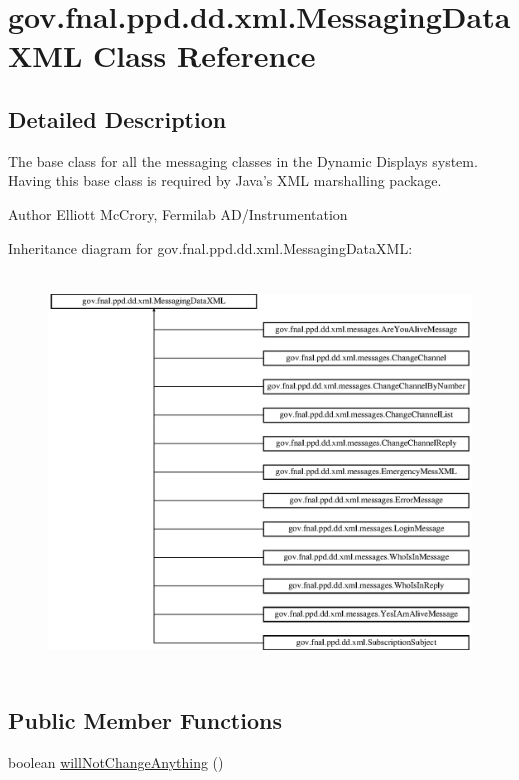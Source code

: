 \hypertarget{classgov_1_1fnal_1_1ppd_1_1dd_1_1xml_1_1MessagingDataXML}{\section{gov.\-fnal.\-ppd.\-dd.\-xml.\-Messaging\-Data\-X\-M\-L Class Reference}
\label{classgov_1_1fnal_1_1ppd_1_1dd_1_1xml_1_1MessagingDataXML}
}


\subsection{Detailed Description}
The base class for all the messaging classes in the Dynamic Displays system. Having this base class is required by Java's X\-M\-L marshalling package.

\begin{DoxyAuthor}{Author}
Elliott Mc\-Crory, Fermilab A\-D/\-Instrumentation 
\end{DoxyAuthor}
Inheritance diagram for gov.\-fnal.\-ppd.\-dd.\-xml.\-Messaging\-Data\-X\-M\-L\-:\begin{figure}[H]
\begin{center}
\leavevmode
\includegraphics[height=10.581395cm]{classgov_1_1fnal_1_1ppd_1_1dd_1_1xml_1_1MessagingDataXML}
\end{center}
\end{figure}
\subsection*{Public Member Functions}
\begin{DoxyCompactItemize}
\item 
boolean \hyperlink{classgov_1_1fnal_1_1ppd_1_1dd_1_1xml_1_1MessagingDataXML_a477db02871dbbabbf8860c6cab5958a6}{will\-Not\-Change\-Anything} ()
\end{DoxyCompactItemize}


